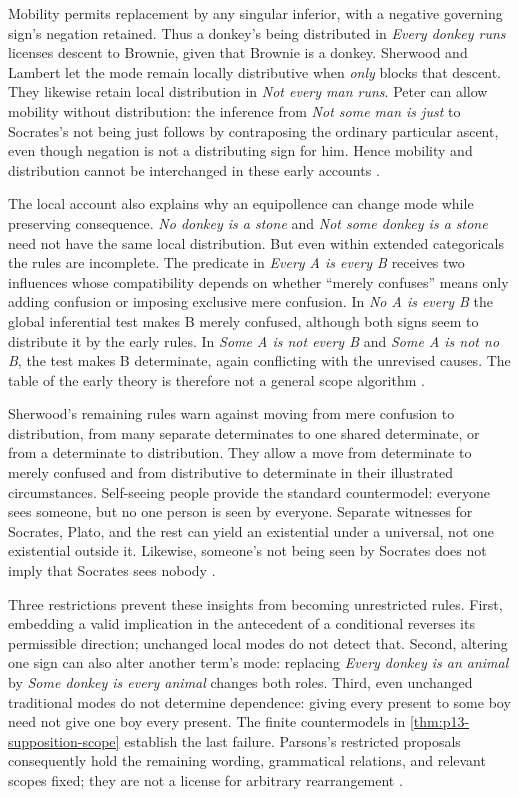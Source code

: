 Mobility permits replacement by any singular inferior, with a negative
governing sign's negation retained. Thus a donkey's being distributed
in \emph{Every donkey runs} licenses descent to Brownie, given that
Brownie is a donkey. Sherwood and Lambert let the mode remain locally
distributive when \emph{only} blocks that descent. They likewise retain
local distribution in \emph{Not every man runs}. Peter can allow
mobility without distribution: the inference from \emph{Not some man
is just} to Socrates's not being just follows by contraposing the
ordinary particular ascent, even though negation is not a distributing
sign for him. Hence mobility and distribution cannot be interchanged
in these early accounts
\cite[pp.~231--237]{Parsons2007FordhamSupposition}.

The local account also explains why an equipollence can change mode
while preserving consequence. \emph{No donkey is a stone} and
\emph{Not some donkey is a stone} need not have the same local
distribution. But even within extended categoricals the rules are
incomplete. The predicate in \emph{Every A is every B} receives two
influences whose compatibility depends on whether ``merely confuses''
means only adding confusion or imposing exclusive mere confusion.
In \emph{No A is every B} the global inferential test makes B merely
confused, although both signs seem to distribute it by the early rules.
In \emph{Some A is not every B} and \emph{Some A is not no B}, the
test makes B determinate, again conflicting with the unrevised causes.
The table of the early theory is therefore not a general scope
algorithm \cite[pp.~230--231,236--237]{Parsons2007FordhamSupposition}.

Sherwood's remaining rules warn against moving from mere confusion
to distribution, from many separate determinates to one shared
determinate, or from a determinate to distribution. They allow a move
from determinate to merely confused and from distributive to determinate
in their illustrated circumstances. Self-seeing people provide the
standard countermodel: everyone sees someone, but no one person is
seen by everyone. Separate witnesses for Socrates, Plato, and the rest
can yield an existential under a universal, not one existential outside
it. Likewise, someone's not being seen by Socrates does not imply that
Socrates sees nobody
\cite[pp.~238--239]{Parsons2007FordhamSupposition}.

Three restrictions prevent these insights from becoming unrestricted
rules. First, embedding a valid implication in the antecedent of a
conditional reverses its permissible direction; unchanged local modes
do not detect that. Second, altering one sign can also alter another
term's mode: replacing \emph{Every donkey is an animal} by
\emph{Some donkey is every animal} changes both roles. Third, even
unchanged traditional modes do not determine dependence: giving every
present to some boy need not give one boy every present. The finite
countermodels in \cref{thm:p13-supposition-scope} establish the last
failure. Parsons's restricted proposals consequently hold the remaining
wording, grammatical relations, and relevant scopes fixed; they are
not a license for arbitrary rearrangement
\cite[pp.~239--241]{Parsons2007FordhamSupposition}.

